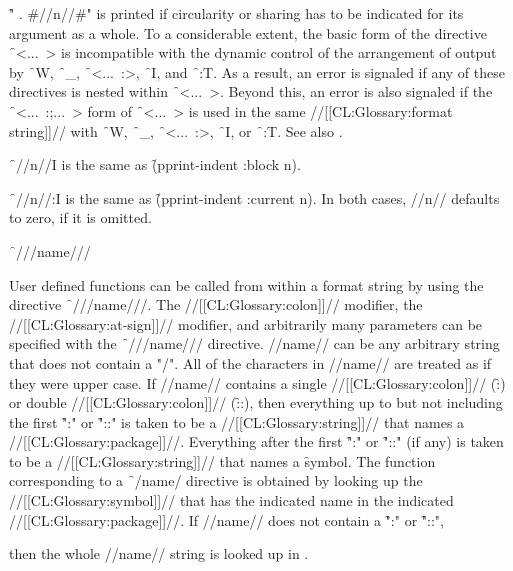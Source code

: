 \f{" . \#//n//\#"} is printed if circularity or sharing has to be indicated for its argument as a whole.
  To a considerable extent, the basic form of the directive \f{~<...~>} is incompatible with the dynamic control of the arrangement of output by \f{~W}, \f{~_}, \f{~<...~:>}, \f{~I}, and \f{~:T}.  As a result, an error  is signaled if any of these directives is nested within \f{~<...~>}.   Beyond this, an error is also signaled if the \f{~<...~:;...~>} form of \f{~<...~>} is used in the same //[[CL:Glossary:format string]]// with  \f{~W}, \f{~_}, \f{~<...~:>}, \f{~I}, or \f{~:T}.
  See also \secref\TildeLessThanJustification.

\endsubsubsection%

  
  \f{~//n//I}  is the same as \f{(pprint-indent :block n)}.

\f{~//n//:I} is the same as \f{(pprint-indent :current n)}. In both cases, //n// defaults to zero, if it is omitted.
  \endsubsubsection%

 

\f{~///name///}

User defined functions can be called from within a format string by using the directive \f{~///name///}. The //[[CL:Glossary:colon]]// modifier, the //[[CL:Glossary:at-sign]]// modifier, and arbitrarily many parameters  can be specified with the \f{~///name///} directive. //name// can be any arbitrary string that does not contain a "/". All of the characters in //name// are treated as if they were upper case. If //name// contains a single //[[CL:Glossary:colon]]// (\f{:}) or double //[[CL:Glossary:colon]]// (\f{::}), then everything up to but not including the first \f{":"} or \f{"::"} is taken to be a //[[CL:Glossary:string]]// that names a //[[CL:Glossary:package]]//. Everything after the first \f{":"} or \f{"::"} (if any) is taken to be a  //[[CL:Glossary:string]]// that names a \f{symbol}.  The function corresponding to a  \f{~/name/} directive is obtained by looking up the //[[CL:Glossary:symbol]]// that has the indicated name in the indicated //[[CL:Glossary:package]]//. If //name// does not contain a \f{":"} or \f{"::"},

then the whole //name// string is looked up in . 

